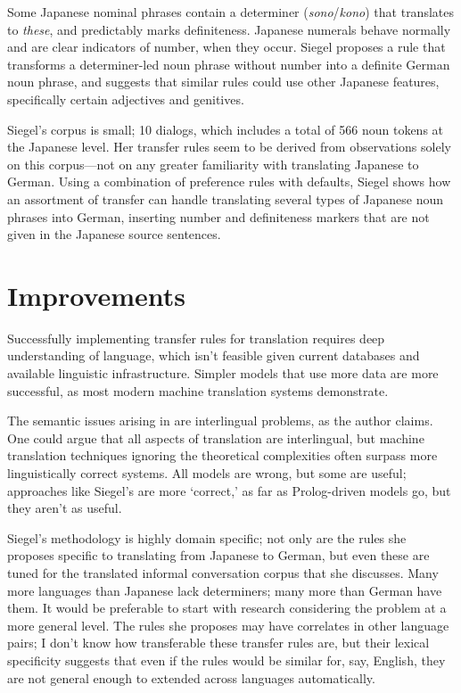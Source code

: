 \documentclass[11pt]{article}
\begin{document}
Some Japanese nominal phrases contain a determiner (\emph{sono}/\emph{kono}) that translates to \emph{these}, and predictably marks definiteness. Japanese numerals behave normally and are clear indicators of number, when they occur. Siegel proposes a rule that transforms a determiner-led noun phrase without number into a definite German noun phrase, and suggests that similar rules could use other Japanese features, specifically certain adjectives and genitives.

Siegel's corpus is small; 10 dialogs, which includes a total of 566 noun tokens at the Japanese level. Her transfer rules seem to be derived from observations solely on this corpus---not on any greater familiarity with translating Japanese to German.
Using a combination of preference rules with defaults, Siegel shows how an assortment of transfer can handle translating several types of Japanese noun phrases into German, inserting number and definiteness markers that are not given in the Japanese source sentences.



\pagebreak
\section{Improvements}

Successfully implementing transfer rules for translation requires deep understanding of language, which isn't feasible given current databases and available linguistic infrastructure. Simpler models that use more data are more successful, as most modern machine translation systems demonstrate.

The semantic issues arising in \citet{siegel:1996} are interlingual problems, as the author claims. One could argue that all aspects of translation are interlingual, but machine translation techniques ignoring the theoretical complexities often surpass more linguistically correct systems.
All models are wrong, but some are useful; approaches like Siegel's are more `correct,' as far as Prolog-driven models go, but they aren't as useful.


Siegel's methodology is highly domain specific; not only are the rules she proposes specific to translating from Japanese to German, but even these are tuned for the translated informal conversation corpus that she discusses.
Many more languages than Japanese lack determiners; many more than German have them. It would be preferable to start with research considering the problem at a more general level. The rules she proposes may have correlates in other language pairs; I don't know how transferable these transfer rules are, but their lexical specificity suggests that even if the rules would be similar for, say, English, they are not general enough to extended across languages automatically.
\end{document}
